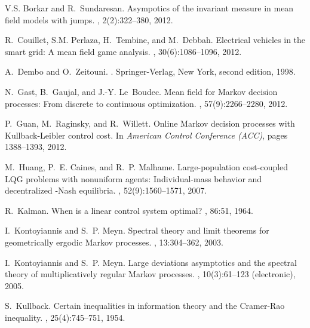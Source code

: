 \documentclass[11pt,twocolumn]{IEEEtran}
\begin{document}
\begin{thebibliography}{10}

V.S. Borkar and R.~Sundaresan.
\newblock Asympotics of the invariant measure in mean field models with jumps.
, 2(2):322--380, 2012.

R.~Couillet, S.M. Perlaza, H.~Tembine, and M.~Debbah.
\newblock Electrical vehicles in the smart grid: A mean field game analysis.
,
  30(6):1086--1096, 2012.

A.~Dembo and O.~Zeitouni.
.
\newblock Springer-Verlag, New York, second edition, 1998.

N.~Gast, B.~Gaujal, and J.-Y. Le~Boudec.
\newblock Mean field for {Markov} decision processes: From discrete to
  continuous optimization.
, 57(9):2266--2280, 2012.

 
P.~Guan, M.~Raginsky, and R.~Willett.
\newblock Online {Markov} decision processes with {Kullback-Leibler} control
  cost.
\newblock In {\em American Control Conference (ACC)}, pages 1388--1393, 2012.



M.~Huang, P.~E. Caines, and R.~P. Malhame.
\newblock Large-population cost-coupled {LQG} problems with nonuniform agents:
  Individual-mass behavior and decentralized {{}-Nash} equilibria.
, 52(9):1560--1571, 2007.

R.~Kalman.
\newblock When is a linear control system optimal?
, 86:51, 1964.

I.~Kontoyiannis and S.~P. Meyn.
\newblock Spectral theory and limit theorems for geometrically ergodic {Markov}
  processes.
, 13:304--362, 2003.


I.~Kontoyiannis and S.~P. Meyn.
\newblock Large deviations asymptotics and the spectral theory of
  multiplicatively regular {M}arkov processes.
, 10(3):61--123 (electronic), 2005.

S.~Kullback.
\newblock Certain inequalities in information theory and the {Cramer-Rao}
  inequality.
, 25(4):745--751, 1954.




\end{thebibliography}
\end{document}
